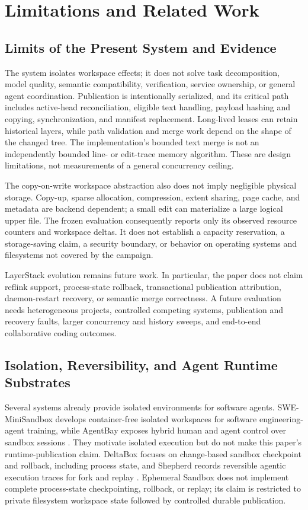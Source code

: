 \section{Limitations and Related Work}
\label{sec:limitations-related-work}

\subsection{Limits of the Present System and Evidence}

The system isolates workspace effects; it does not solve task decomposition,
model quality, semantic compatibility, verification, service ownership, or
general agent coordination. Publication is intentionally serialized, and its
critical path includes active-head reconciliation, eligible text handling,
payload hashing and copying, synchronization, and manifest replacement.
Long-lived leases can retain historical layers, while path validation and merge
work depend on the shape of the changed tree. The implementation's bounded
text merge is not an independently bounded line- or edit-trace memory
algorithm. These are design limitations, not measurements of a general
concurrency ceiling.

The copy-on-write workspace abstraction also does not imply negligible physical
storage. Copy-up, sparse allocation, compression, extent sharing, page cache,
and metadata are backend dependent; a small edit can materialize a large
logical upper file. The frozen evaluation consequently reports only its
observed resource counters and workspace deltas. It does not establish a
capacity reservation, a storage-saving claim, a security boundary, or behavior
on operating systems and filesystems not covered by the campaign.

LayerStack evolution remains future work. In particular, the paper does not
claim reflink support, process-state rollback, transactional publication
attribution, daemon-restart recovery, or semantic merge correctness. A future
evaluation needs heterogeneous projects, controlled competing systems,
publication and recovery faults, larger concurrency and history sweeps, and
end-to-end collaborative coding outcomes.

\subsection{Isolation, Reversibility, and Agent Runtime Substrates}

Several systems already provide isolated environments for software agents.
SWE-MiniSandbox develops container-free isolated workspaces for software
engineering-agent training, while AgentBay exposes hybrid human and agent
control over sandbox sessions \cite{swe_minisandbox_2026,agentbay_2025}. They
motivate isolated execution but do not make this paper's runtime-publication
claim. DeltaBox focuses on change-based sandbox checkpoint and rollback,
including process state, and Shepherd records reversible agentic execution
traces for fork and replay \cite{deltabox_2026,shepherd_2026}. Ephemeral
Sandbox does not implement complete process-state checkpointing, rollback, or
replay; its claim is restricted to private filesystem workspace state followed
by controlled durable publication.

